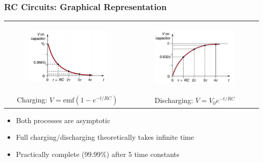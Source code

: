 \documentclass{beamer}
\begin{document}
\begin{frame}
    \frametitle{RC Circuits: Graphical Representation}
    \begin{center}
        \begin{tabular}{cc}
            \begin{figure}
    \centering
    \includegraphics[width=0.5\linewidth]{phys12-circuits-capacitor-discharge-curve.png}
\end{figure} 
&
\begin{figure}
                \centering
                \includegraphics[width=0.4\linewidth]{phys12-electrostatics-charge-interactions.png}
            \end{figure} \\


                        Charging: $V = \text{emf}(1-e^{-t/RC})$ & Discharging: $V = V_0e^{-t/RC}$
        \end{tabular}
    \end{center}
    \begin{itemize}
        \item Both processes are asymptotic
        \item Full charging/discharging theoretically takes infinite time
        \item Practically complete (99.99\%) after 5 time constants
    \end{itemize}
\end{frame}

\end{document}
